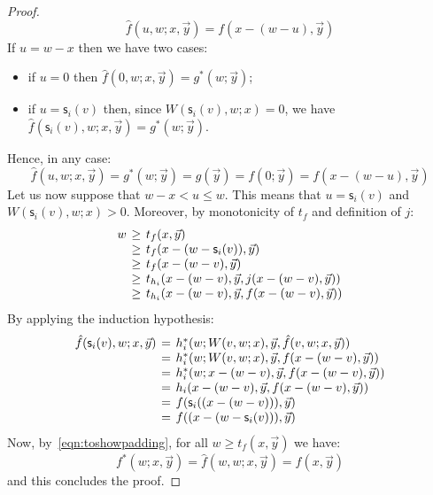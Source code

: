 \documentclass[manuscript,screen]{acmart}
\theoremstyle{definition}
\theoremstyle{remark}
\renewcommand{\succ}[1]{\mathsf{s}_{#1}}
\begin{document}
\begin{proof}
\begin{equation}
\label{eqn:toshowpadding}
    \hat{f}(u,w;x,\vec{y})=f(x-(w-u), \vec{y})
\end{equation}
If $u=w-x$ then we have two cases:
\begin{itemize}
    \item if $u=0$ then $\hat{f}(0, w; x, \vec{y})=g^*(w; \vec{y})$;
    \item if $u=\succ i(v)$ then, since $W(\succ i(v),w;x)=0$, we have $\hat{f}(\succ i(v), w; x, \vec{y})=g^*(w; \vec{y})$.
\end{itemize}
Hence, in any case:
\begin{equation*}
\hat{f}(u, w; x, \vec{y})=g^*(w; \vec{y})=g(\vec y)=f(0; \vec{y})= f(x-(w-u), \vec{y})    
\end{equation*}
Let us now suppose that $w-x<u\leq w$. This means that $u=\succ i(v)$ and $W(\succ i(v),w;x)>0$. Moreover,  by monotonicity of $t_f$ and definition of $j$:
\begin{equation*}
\arraycolsep=2pt
\begin{array}{rcl}
     w &\geq&     t_f(x, \vec{y})\\ 
     &\geq& t_f(x-(w-\succ i(v)), \vec{y}) \\
     &\geq& t_f(x-(w-v), \vec{y}) \\
     &\geq& t_{h_i}(x-(w-v), \vec{y}, j(x-(w-v), \vec{y}))\\
      &\geq& t_{h_i}(x-(w-v), \vec{y}, f(x-(w-v), \vec{y}))
\end{array}
\end{equation*}
By applying the induction hypothesis:
\begin{equation*}
\arraycolsep=2pt
\begin{array}{rcl}
      \hat{f}(\succ i(v), w; x, \vec{y})&=&
        h^*_i(w; W(v, w;x), \vec{y}, \hat{f}(v,w;x, \vec{y}))\\
         &=&  h^*_i(w; W(v, w;x), \vec{y}, f(x-(w-v), \vec{y}))\\
         &=& h^*_i(w; x-(w-v), \vec{y}, f(x-(w-v), \vec{y}))\\
         &=& h_i(x-(w-v), \vec{y}, f(x-(w-v), \vec{y}))\\
           &=&f(\succ i((x-(w-v))), \vec{y})\\
           &=& f((x-(w-\succ i(v))), \vec{y})
\end{array}
\end{equation*}
Now, by~\eqref{eqn:toshowpadding}, for all $w \geq t_f(x, \vec{y})$ we have:
\begin{equation*}
  f^*(w; x, \vec{y})=  \hat{f}(w,w;x, \vec{y})= f(x, \vec{y})
\end{equation*}
and this concludes the proof.
\end{proof}
\end{document}
